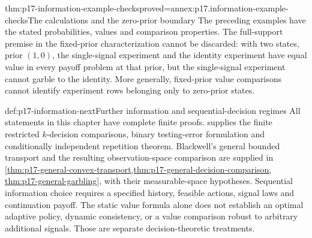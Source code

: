 \begin{hbtheorem}{thm:p17-information-example-checks}{proved=annex:p17.information-example-checks}{The calculations and the zero-prior boundary}
The preceding examples have the stated probabilities, values and
comparison properties.
The full-support premise in the fixed-prior characterization cannot be
discarded: with two states, prior \((1,0)\), the single-signal experiment
and the identity experiment have equal value in every payoff problem at
that prior, but the single-signal experiment cannot garble to the identity.
More generally, fixed-prior value comparisons cannot identify experiment
rows belonging only to zero-prior states.
\end{hbtheorem}

\begin{proofboundary}{def:p17-information-next}{Further information and sequential-decision regimes}
All statements in this chapter have complete finite proofs.
 supplies the finite
restricted \(k\)-decision comparisons, binary testing-error formulation
and conditionally independent repetition theorem.
Blackwell's general bounded transport and the resulting observation-space
comparison are supplied in
\cref{thm:p17-general-convex-transport,thm:p17-general-decision-comparison,
thm:p17-general-garbling}, with their measurable-space hypotheses.
Sequential information choice requires a
specified history, feasible actions, signal laws and continuation payoff.
The static value formula alone does not establish an optimal adaptive policy,
dynamic consistency, or a value comparison robust to arbitrary additional
signals. Those are separate decision-theoretic treatments.
\end{proofboundary}
